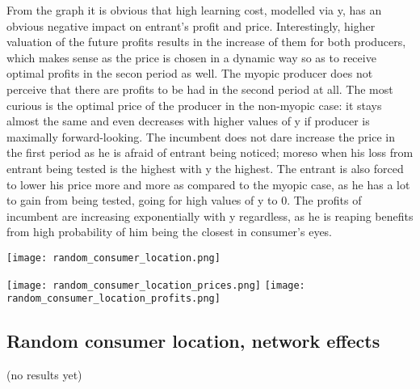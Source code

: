 \documentclass{article}
\begin{document}
From the graph it is obvious that high learning cost, modelled via y, has an obvious negative impact on entrant's profit and price. Interestingly, higher valuation of the future profits results in the increase of them for both producers, which makes sense as the price is chosen in a dynamic way so as to receive optimal profits in the secon period as well. The myopic producer does not perceive that there are profits to be had in the second period at all. The most curious is the optimal price of the producer in the non-myopic case: it stays almost the same and even decreases with higher values of y if producer is maximally forward-looking. The incumbent does not dare increase the price in the first period as he is afraid of entrant being noticed; moreso when his loss from entrant being tested is the highest with y the highest. The entrant is also forced to lower his price more and more as compared to the myopic case, as he has a lot to gain from being tested, going for high values of y to 0. The profits of incumbent are increasing exponentially with y regardless, as he is reaping benefits from high probability of him being the closest in consumer's eyes. 

\begin{center}
    \texttt{[image: random\_consumer\_location.png]}
\end{center}


\texttt{[image: random\_consumer\_location\_prices.png]}
\texttt{[image: random\_consumer\_location\_profits.png]}

\subsection{Random consumer location, network effects}

(no results yet)








%
    
\end{document}
